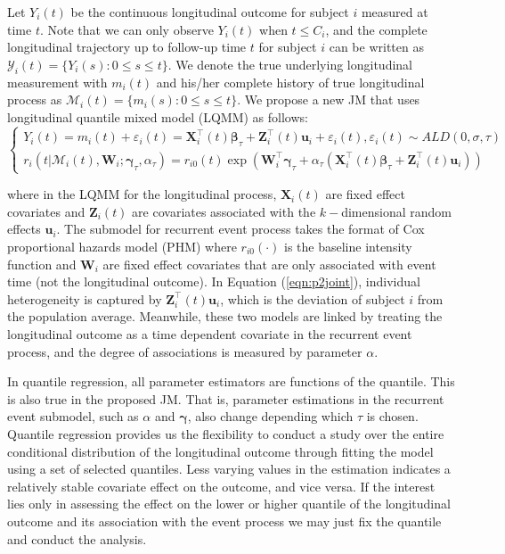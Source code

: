 Let $Y_{i}(t)$ be the continuous longitudinal outcome for subject $i$ measured at time $t$. Note that we can only observe $Y_{i}(t)$ when $t\le C_i$, and the complete longitudinal trajectory up to follow-up time $t$ for subject $i$ can be written as $\mathcal{Y}_{i}(t)=\{Y_{i}(s): 0\le s\le t\}$. We denote the true underlying longitudinal measurement with $m_{i}(t)$ and his/her complete history of true longitudinal process as $\mathcal{M}_{i}(t)=\{m_{i}(s): 0\le s \le t\}$. We propose a new JM that uses longitudinal quantile mixed model (LQMM) as follows:
\begin{equation}\label{eqn:p2joint}
\left\{
\begin{array}{l}
Y_{i}(t) = m_{i}(t) + \varepsilon_{i}(t) = {\boldsymbol X}_{i}^{\top}(t)\boldsymbol{\beta}_{\tau} + {\boldsymbol Z}_{i}^{\top}(t){\boldsymbol u}_i + \varepsilon_{i}(t), \varepsilon_{i}(t)\sim ALD(0, \sigma, \tau)\\
r_i(t|\mathcal{M}_{i}(t), {\boldsymbol W}_i;  \boldsymbol{\gamma}_{\tau}, \alpha_{\tau}) = r_{i0}(t)\exp({\boldsymbol W}_i^{\top}\boldsymbol{\gamma}_{\tau} + \alpha_{\tau}({\boldsymbol X}^{\top}_{i}(t)\boldsymbol{\beta}_{\tau} + {\boldsymbol Z}^{\top}_{i}(t){\boldsymbol u}_{i}))
\end{array}
\right.
\end{equation}

\noindent where in the LQMM for the longitudinal process, $\boldsymbol{X}_{i}(t)$ are fixed effect covariates and $\boldsymbol{Z}_{i}(t)$ are covariates associated with the $k-$dimensional random effects $\boldsymbol{u}_i$. The submodel for recurrent event process takes the format of Cox proportional hazards model (PHM) where $r_{i0}(\cdot)$ is the baseline intensity function and $\boldsymbol{W}_{i}$ are fixed effect covariates that are only associated with event time (not the longitudinal outcome). In Equation (\ref{eqn:p2joint}), individual heterogeneity is captured by ${\boldsymbol Z}_{i}^{\top}(t){\boldsymbol u}_i$, which is the deviation of subject $i$ from the population average. Meanwhile, these two models are linked by treating the longitudinal outcome as a time dependent covariate in the recurrent event process, and the degree of associations is measured by parameter $\alpha$.

In quantile regression, all parameter estimators are functions of the quantile. This is also true in the proposed JM. That is, parameter estimations in the recurrent event submodel, such as $\alpha$ and $\boldsymbol{\gamma}$, also change depending which $\tau$ is chosen. Quantile regression provides us the flexibility to conduct a study over the entire conditional distribution of the longitudinal outcome through fitting the model using a set of selected quantiles. Less varying values in the estimation indicates a relatively stable covariate effect on the outcome, and vice versa. If the interest lies only in assessing the effect on the lower or higher quantile of the longitudinal outcome and its association with the event process we may just fix the quantile and conduct the analysis.

